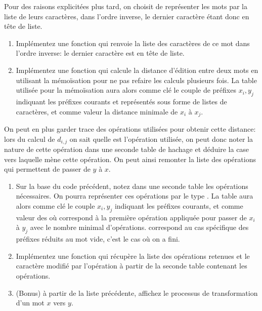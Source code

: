 \documentclass[a4paper, 10pt]{article}
\begin{document}
Pour des raisons explicitées plus tard, on choisit de représenter les mots par la liste de leurs caractères, dans l'ordre inverse, le dernier caractère étant donc en tête de liste.
\begin{enumerate}[resume]
\item Implémentez une fonction  qui renvoie la liste des caractères de ce mot dans l'ordre inverse: le dernier caractère est en tête de liste.
\item Implémentez une fonction  qui calcule la distance d'édition entre deux mots en utilisant la mémoïsation pour ne pas refaire les calculs plusieurs fois.
  La table utilisée pour la mémoïsation aura alors comme clé le couple de préfixes \(x_i,y_j\) indiquant les préfixes courants et représentés sous forme de listes de caractères, et comme valeur la distance minimale de \(x_i\) à \(x_j\).
\end{enumerate}
On peut en plus garder trace des opérations utilisées pour obtenir cette distance: lors du calcul de \(d_{i,j}\) on sait quelle est l'opération utilisée, on peut donc noter la nature de cette opération dans une seconde table de hachage et déduire la case vers laquelle mène cette opération. On peut ainsi remonter la liste des opérations qui permettent de passer de \(y\) à \(x\).
\begin{enumerate}[resume]
\item Sur la base du code précédent, notez dans une seconde table les opérations nécessaires. On pourra représenter ces opérations par le type . La table aura alors comme clé le couple \(x_i,y_j\) indiquant les préfixes courants, et comme valeur des   où  correspond à la première opération appliquée pour passer de \(x_i\) à \(y_j\) avec le nombre minimal d'opérations.  correspond au cas spécifique des préfixes réduits au mot vide, c'est le cas où on a fini.
\item Implémentez une fonction  qui récupère la liste des opérations retenues et le caractère modifié par l'opération à partir de la seconde table contenant les opérations.
\item (Bonus) à partir de la liste précédente, affichez le processus de transformation d'un mot \(x\) vers \(y\).
\end{enumerate}
\end{document}
